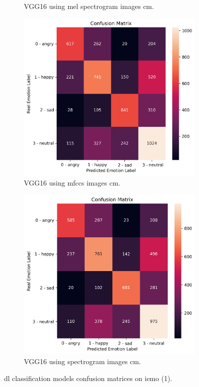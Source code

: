 \begin{figure}[H]
\begin{subfigure}{.5\textwidth}
		\caption{VGG16 using mel spectrogram images \ac{cm}.}
	\end{subfigure}
	\newline
	\begin{subfigure}{.5\textwidth}
		\centering
		\includegraphics[width=.9\linewidth]{figs/appendix/feature_selection/VGGMFCC.png}
		\caption{VGG16 using \ac{mfccs} images \ac{cm}.}
	\end{subfigure}%
	\begin{subfigure}{.5\textwidth}
		\centering
		\includegraphics[width=.9\linewidth]{figs/appendix/feature_selection/VGGSpec.png}
		\caption{VGG16 using spectrogram images \ac{cm}.}
	\end{subfigure}
	\caption{\ac{dl} classification models confusion matrices on \ac{iemo} (1).}
\end{figure}

